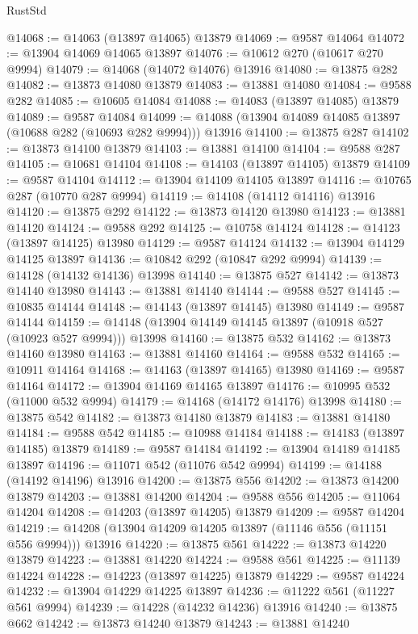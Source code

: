 \begin{lexlean}{RustStd}
\begin{coremodule}
@14068 := @14063 (@13897 @14065) @13879
@14069 := @9587 @14064
@14072 := @13904 @14069 @14065 @13897
@14076 := @10612 @270 (@10617 @270 @9994)
@14079 := @14068 (@14072 @14076) @13916
@14080 := @13875 @282
@14082 := @13873 @14080 @13879
@14083 := @13881 @14080
@14084 := @9588 @282
@14085 := @10605 @14084
@14088 := @14083 (@13897 @14085) @13879
@14089 := @9587 @14084
@14099 := @14088 (@13904 @14089 @14085 @13897 (@10688 @282 (@10693 @282 @9994))) @13916
@14100 := @13875 @287
@14102 := @13873 @14100 @13879
@14103 := @13881 @14100
@14104 := @9588 @287
@14105 := @10681 @14104
@14108 := @14103 (@13897 @14105) @13879
@14109 := @9587 @14104
@14112 := @13904 @14109 @14105 @13897
@14116 := @10765 @287 (@10770 @287 @9994)
@14119 := @14108 (@14112 @14116) @13916
@14120 := @13875 @292
@14122 := @13873 @14120 @13980
@14123 := @13881 @14120
@14124 := @9588 @292
@14125 := @10758 @14124
@14128 := @14123 (@13897 @14125) @13980
@14129 := @9587 @14124
@14132 := @13904 @14129 @14125 @13897
@14136 := @10842 @292 (@10847 @292 @9994)
@14139 := @14128 (@14132 @14136) @13998
@14140 := @13875 @527
@14142 := @13873 @14140 @13980
@14143 := @13881 @14140
@14144 := @9588 @527
@14145 := @10835 @14144
@14148 := @14143 (@13897 @14145) @13980
@14149 := @9587 @14144
@14159 := @14148 (@13904 @14149 @14145 @13897 (@10918 @527 (@10923 @527 @9994))) @13998
@14160 := @13875 @532
@14162 := @13873 @14160 @13980
@14163 := @13881 @14160
@14164 := @9588 @532
@14165 := @10911 @14164
@14168 := @14163 (@13897 @14165) @13980
@14169 := @9587 @14164
@14172 := @13904 @14169 @14165 @13897
@14176 := @10995 @532 (@11000 @532 @9994)
@14179 := @14168 (@14172 @14176) @13998
@14180 := @13875 @542
@14182 := @13873 @14180 @13879
@14183 := @13881 @14180
@14184 := @9588 @542
@14185 := @10988 @14184
@14188 := @14183 (@13897 @14185) @13879
@14189 := @9587 @14184
@14192 := @13904 @14189 @14185 @13897
@14196 := @11071 @542 (@11076 @542 @9994)
@14199 := @14188 (@14192 @14196) @13916
@14200 := @13875 @556
@14202 := @13873 @14200 @13879
@14203 := @13881 @14200
@14204 := @9588 @556
@14205 := @11064 @14204
@14208 := @14203 (@13897 @14205) @13879
@14209 := @9587 @14204
@14219 := @14208 (@13904 @14209 @14205 @13897 (@11146 @556 (@11151 @556 @9994))) @13916
@14220 := @13875 @561
@14222 := @13873 @14220 @13879
@14223 := @13881 @14220
@14224 := @9588 @561
@14225 := @11139 @14224
@14228 := @14223 (@13897 @14225) @13879
@14229 := @9587 @14224
@14232 := @13904 @14229 @14225 @13897
@14236 := @11222 @561 (@11227 @561 @9994)
@14239 := @14228 (@14232 @14236) @13916
@14240 := @13875 @662
@14242 := @13873 @14240 @13879
@14243 := @13881 @14240

\end{coremodule}
\end{lexlean}
